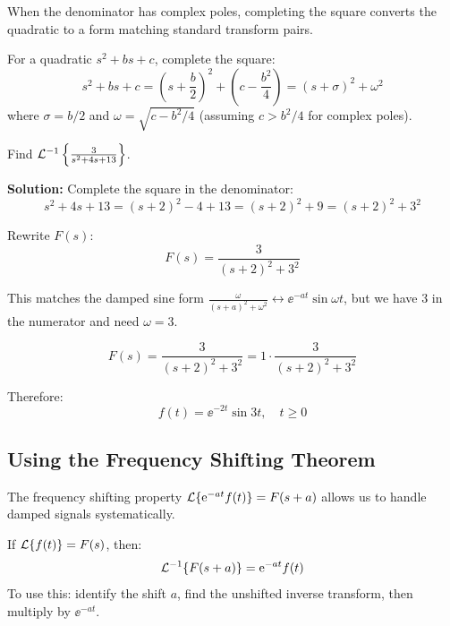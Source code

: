 When the denominator has complex poles, completing the square converts the quadratic to a form matching standard transform pairs.

\begin{keyconceptbox}[title=Completing the Square]
For a quadratic $s^2 + bs + c$, complete the square:
\begin{equation}
s^2 + bs + c = \left(s + \frac{b}{2}\right)^2 + \left(c - \frac{b^2}{4}\right) = (s+\sigma)^2 + \omega^2
\end{equation}
where $\sigma = b/2$ and $\omega = \sqrt{c - b^2/4}$ (assuming $c > b^2/4$ for complex poles).
\end{keyconceptbox}

\begin{examplebox}[title=Example: Completing the Square]
Find $\mathcal{L}^{-1}\left\{ \frac{3}{s^2 + 4s + 13} \right\}$.

\textbf{Solution:}
Complete the square in the denominator:
\begin{equation}
s^2 + 4s + 13 = (s+2)^2 - 4 + 13 = (s+2)^2 + 9 = (s+2)^2 + 3^2
\end{equation}

Rewrite $F(s)$:
\begin{equation}
F(s) = \frac{3}{(s+2)^2 + 3^2}
\end{equation}

This matches the damped sine form $\frac{\omega}{(s+a)^2+\omega^2} \leftrightarrow \ee^{-at}\sin\omega t$, but we have 3 in the numerator and need $\omega = 3$.

\begin{equation}
F(s) = \frac{3}{(s+2)^2 + 3^2} = 1 \cdot \frac{3}{(s+2)^2 + 3^2}
\end{equation}

Therefore:
\begin{equation}
\boxed{f(t) = \ee^{-2t}\sin 3t, \quad t \geq 0}
\end{equation}
\end{examplebox}

\subsection{Using the Frequency Shifting Theorem}

The frequency shifting property $\mathcal{L}\{\mathrm{e}^{-at}f(t)\} = F(s+a)$ allows us to handle damped signals systematically.

\begin{keyconceptbox}[title=Inverse Frequency Shift]
If $\mathcal{L}\{f(t)\} = F(s)$, then:
\begin{equation}
\mathcal{L}^{-1}\{F(s+a)\} = \mathrm{e}^{-at}f(t)
\end{equation}
To use this: identify the shift $a$, find the unshifted inverse transform, then multiply by $\ee^{-at}$.
\end{keyconceptbox}

